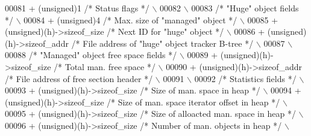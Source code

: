 \begin{DoxyCode}
00081 \textcolor{preprocessor}{    + (unsigned)1 }\textcolor{comment}{/* Status flags */}\textcolor{preprocessor}{                                          \(\backslash\)}
00082 \textcolor{preprocessor}{                                                                              \(\backslash\)}
00083 \textcolor{preprocessor}{    }\textcolor{comment}{/* "Huge" object fields */}\textcolor{preprocessor}{                                                \(\backslash\)}
00084 \textcolor{preprocessor}{    + (unsigned)4 }\textcolor{comment}{/* Max. size of "managed" object */}\textcolor{preprocessor}{                         \(\backslash\)}
00085 \textcolor{preprocessor}{    + (unsigned)(h)->sizeof\_size }\textcolor{comment}{/* Next ID for "huge" object */}\textcolor{preprocessor}{              \(\backslash\)}
00086 \textcolor{preprocessor}{    + (unsigned)(h)->sizeof\_addr }\textcolor{comment}{/* File address of "huge" object tracker B-tree  */}\textcolor{preprocessor}{    \(\backslash\)}
00087 \textcolor{preprocessor}{                                                                              \(\backslash\)}
00088 \textcolor{preprocessor}{    }\textcolor{comment}{/* "Managed" object free space fields */}\textcolor{preprocessor}{                                  \(\backslash\)}
00089 \textcolor{preprocessor}{    + (unsigned)(h)->sizeof\_size }\textcolor{comment}{/* Total man. free space */}\textcolor{preprocessor}{                  \(\backslash\)}
00090 \textcolor{preprocessor}{    + (unsigned)(h)->sizeof\_addr }\textcolor{comment}{/* File address of free section header */}\textcolor{preprocessor}{    \(\backslash\)}
00091 \textcolor{preprocessor}{                                                                              \(\backslash\)}
00092 \textcolor{preprocessor}{    }\textcolor{comment}{/* Statistics fields */}\textcolor{preprocessor}{                                                   \(\backslash\)}
00093 \textcolor{preprocessor}{    + (unsigned)(h)->sizeof\_size }\textcolor{comment}{/* Size of man. space in heap */}\textcolor{preprocessor}{             \(\backslash\)}
00094 \textcolor{preprocessor}{    + (unsigned)(h)->sizeof\_size }\textcolor{comment}{/* Size of man. space iterator offset in heap */}\textcolor{preprocessor}{ \(\backslash\)}
00095 \textcolor{preprocessor}{    + (unsigned)(h)->sizeof\_size }\textcolor{comment}{/* Size of alloacted man. space in heap */}\textcolor{preprocessor}{   \(\backslash\)}
00096 \textcolor{preprocessor}{    + (unsigned)(h)->sizeof\_size }\textcolor{comment}{/* Number of man. objects in heap */}\textcolor{preprocessor}{         \(\backslash\)}

\end{DoxyCode}
